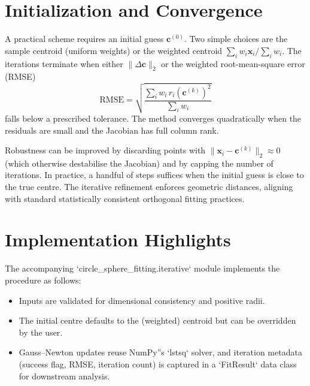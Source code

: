 \documentclass[11pt]{article}
\begin{document}
\section{Initialization and Convergence}
A practical scheme requires an initial guess $\mathbf{c}^{(0)}$. Two simple choices are the sample centroid (uniform weights) or the weighted centroid $\sum_i w_i \mathbf{x}_i / \sum_i w_i$. The iterations terminate when either $\lVert \Delta \mathbf{c} \rVert_2$ or the weighted root-mean-square error (RMSE)
\begin{equation}
  \mathrm{RMSE} = \sqrt{ \frac{\sum_i w_i \, r_i(\mathbf{c}^{(k)})^2}{\sum_i w_i} }
\end{equation}
falls below a prescribed tolerance. The method converges quadratically when the residuals are small and the Jacobian has full column rank.

Robustness can be improved by discarding points with $\lVert \mathbf{x}_i - \mathbf{c}^{(k)} \rVert_2 \approx 0$ (which otherwise destabilise the Jacobian) and by capping the number of iterations. In practice, a handful of steps suffices when the initial guess is close to the true centre. The iterative refinement enforces geometric distances, aligning with standard statistically consistent orthogonal fitting practices.

\section{Implementation Highlights}
The accompanying `circle_sphere_fitting.iterative` module implements the procedure as follows:
\begin{itemize}
  \item Inputs are validated for dimensional consistency and positive radii.
  \item The initial centre defaults to the (weighted) centroid but can be overridden by the user.
  \item Gauss--Newton updates reuse NumPy''s `lstsq` solver, and iteration metadata (success flag, RMSE, iteration count) is captured in a `FitResult` data class for downstream analysis.
\end{itemize}
\end{document}
